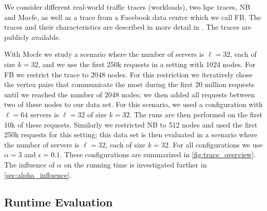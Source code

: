 \documentclass[a4paper,UKenglish,cleveref, autoref, thm-restate,authorcolumns]{../lipics/lipics-v2019}
\newcommand{\fb}{FB}
\newcommand{\dbmocfe}{Mocfe}
\newcommand{\dbnekbone}{NB}
\begin{document}
We consider different real-world traffic traces (workloads),
two hpc traces, \dbnekbone{} and \dbmocfe{}, as well as a trace from 
a Facebook data center which we call \fb{}.
 The traces and their characteristics 
are described in more detail in \cite{Avin2019}.
The traces are publicly available.

With \dbmocfe{} we study a scenario 
where the number of servers is $\ell=32$, each of size $k=32$, and 
we use the first 250k requests in a setting with 1024 nodes. 
For \fb{} we restrict the trace to 2048 nodes. For this restriction we 
 iteratively chose the vertex pairs that communicate the most during the first 20 million requests 
until we reached the number of 2048 nodes; we 
then added all requests between two of these nodes to our data set. 
For this scenario, we used a configuration with $\ell=64$ 
servers is $\ell=32$ of size $k=32$.
The runs are then performed on the first 10k of these requests. Similarly we  restricted \dbnekbone{} to 512 nodes and 
used the first 250k requests for this setting; 
this data set is then evaluated in a scenario where the number of servers is $\ell=32$, each of size $k=32$.
For all configurations we use $\alpha=3$ and $\epsilon=0.1$.
These configurations are summarized in \cref{fig:trace_overview}.
The influence of $\alpha$ on the running time is investigated further in \cref{sec:alpha_influence}.

\subsection{Runtime Evaluation}
\end{document}
